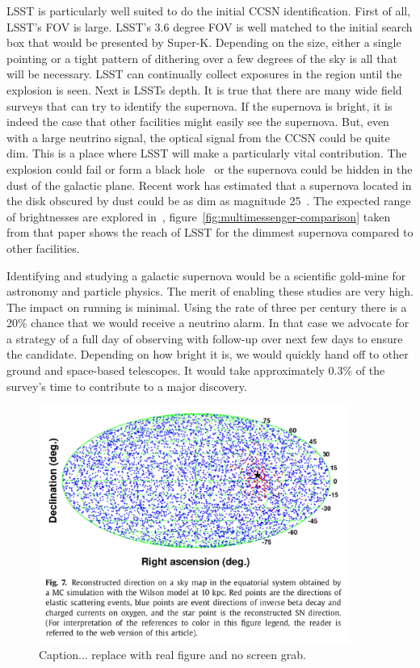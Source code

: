 \documentclass[12pt, letterpaper]{article}
\newcommand{\superk}  {Super\nobreakdash-K\xspace}
\begin{document}
LSST is particularly well suited to do the initial CCSN
identification.  First of all, LSST's FOV is large. LSST's 3.6 degree
FOV is well matched to the initial search box that would be presented
by \superk.  Depending on the size, either a single pointing or a
tight pattern of dithering over a few degrees of the sky is all that
will be necessary.  LSST can continually collect exposures in the
region until the explosion is seen. Next is LSSTs depth. It is true
that there are many wide field surveys that can try to identify the
supernova.  If the supernova is bright, it is indeed the case that
other facilities might easily see the supernova.  But, even with a
large neutrino signal, the optical signal from the CCSN could be quite
dim.  This is a place where LSST will make a particularly vital
contribution.  The explosion could fail or form a black
hole~\cite{2011ApJ...730...70O, 2017hsn..book.1555O} or the supernova
could be hidden in the dust of the galactic plane.  Recent work has
estimated that a supernova located in the disk obscured by dust could
be as dim as magnitude 25~\cite{2016MNRAS.461.3296N}.  The expected
range of brightnesses are explored in~\cite{2016MNRAS.461.3296N},
figure~\ref{fig:multimessenger-comparison} taken from that paper shows
the reach of LSST for the dimmest supernova compared to other
facilities.

Identifying and studying a galactic supernova would be a scientific
gold-mine for astronomy and particle physics.  The merit of enabling
these studies are very high. The impact on running is minimal.  Using
the rate of three per century there is a 20\% chance that we would
receive a neutrino alarm. In that case we advocate for a strategy of a
full day of observing with follow-up over next few days to ensure the
candidate.  Depending on how bright it is, we would quickly hand off
to other ground and space-based telescopes.  It would take
approximately 0.3\% of the survey's time to contribute to a major
discovery.

\clearpage

\begin{figure}
  \begin{center}
    \includegraphics[width=4.0in]{SK-realtime-monitor-pointing}
    \caption{Caption... replace with real figure and no screen grab.}
    \label{fig:SK-realtime-monitor-pointing}
  \end{center}
\end{figure}
\end{document}
